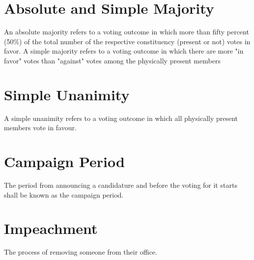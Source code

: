 \section{Absolute and Simple Majority}
An absolute majority refers to a voting outcome in which more than fifty percent (50\%) of the total number of the respective constituency (present or not) votes in favor.  A simple majority refers to a voting outcome in which there are more "in favor" votes than "against" votes among the physically present members

\section{Simple Unanimity}
A simple unanimity refers to a voting outcome in which all physically present members vote in favour.


\section{Campaign Period}
The period from announcing a candidature and before the voting for it starts shall be known as the campaign period.

\section{Impeachment}
The process of removing someone from their office.